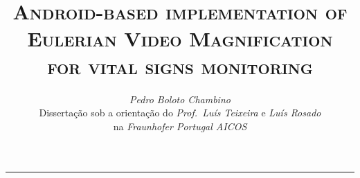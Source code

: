 \documentclass[9pt,a4paper]{extarticle}
\begin{document}
\title{\vspace*{-8mm}\textbf{\textsc{Android-based implementation of Eulerian Video Magnification\\for vital signs monitoring}}}
\author{\emph{Pedro Boloto Chambino}\\[2mm]
\small{Dissertação sob a orientação do \emph{Prof.\ Luís Teixeira} e \emph{Luís Rosado}}\\
\small{na \emph{Fraunhofer Portugal AICOS}}}
\date{}
\maketitle
\thispagestyle{empty}

\vspace*{-4mm}\noindent\rule{\textwidth}{0.4pt}\vspace*{4mm}
\end{document}

